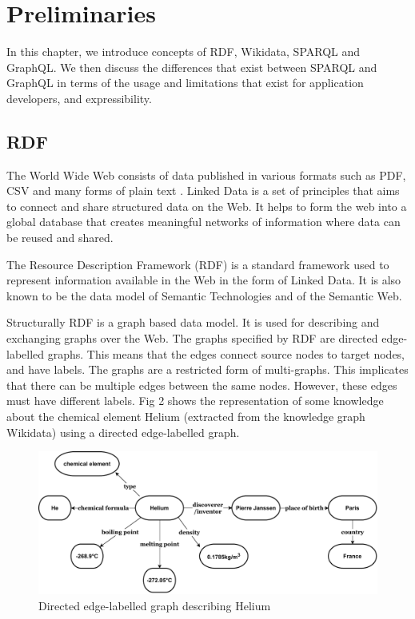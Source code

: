 \chapter{Preliminaries}
In this chapter, we introduce concepts of RDF, Wikidata, SPARQL and GraphQL. We then discuss the differences that exist between SPARQL and GraphQL in terms of the usage and limitations that exist for application developers, and expressibility.

\section{RDF}
The World Wide Web consists of data published in various formats such as PDF, CSV and many forms of plain text \cite{Ruth2013}. Linked Data is a set of principles that aims to connect and share structured data on the Web. It helps to form the web into a global database that creates meaningful networks of information where data can be reused and shared. 

The Resource Description Framework (RDF) is a standard framework used to represent information available in the Web in the form of Linked Data. It is also known to be the data model of Semantic Technologies and of the Semantic Web. 

Structurally RDF is a graph based data model. It is used for describing and exchanging graphs over the Web. The graphs specified by RDF are directed edge-labelled graphs. This means that the edges connect source nodes to target nodes, and have labels. The graphs are a restricted form of multi-graphs. This implicates that there can be multiple edges between the same nodes. However, these edges must have different labels. Fig 2 shows the representation of some knowledge about the chemical element Helium (extracted from the knowledge graph Wikidata) using a directed edge-labelled graph. 


\begin{figure}[h]
  \centering
  \includegraphics[width=0.80\linewidth]{images/del_graph.drawio.pdf}
  \caption{Directed edge-labelled graph describing Helium}
  \label{fig:figure 1}
\end{figure}

